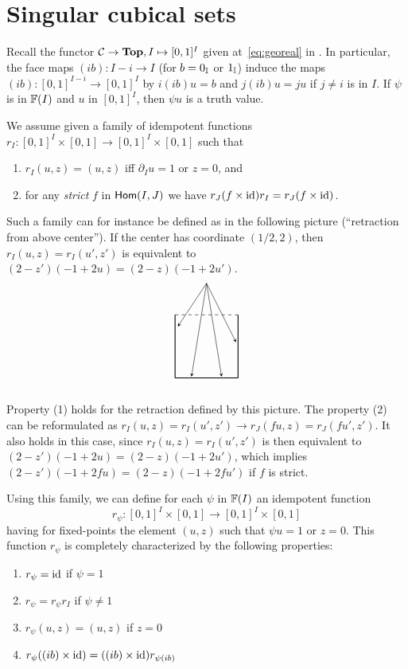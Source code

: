 \section{Singular cubical sets}\label{sec-singular}

Recall the functor $\mathcal{C} \to \mathbf{Top}, I \mapsto [0,1]^I$ given
at~\eqref{eq:georeal} in . In particular, the face
maps $(ib) \colon I-i \to I$ (for $b=0_{\mathbb{I}}$ or $1_{\mathbb{I}}$) induce the
maps $(ib)\colon [0,1]^{I-i} \to [0, 1]^{I}$ by $i(ib)u = b$ and
$j(ib)u = ju$ if $j\neq i$ is in $I$.  If $\psi$ is in $\mathbb{F}(I)$ and
$u$ in $[0,1]^I$, then $\psi u$ is a truth value.

We assume given a family of idempotent functions
$r_I:[0,1]^I\times [0,1]\rightarrow [0,1]^I\times [0,1]$ such that
\begin{enumerate}
\item $r_I(u,z) = (u,z)$ if{f} $\partial_I u = 1$ or $z = 0$, and
\item for any {\em strict} $f$ in ${\sf Hom}(I,J)$ we have
  $r_J(f\times\mathrm{id})r_I = r_J(f\times\mathrm{id})$.
\end{enumerate}

\medskip

Such a family can for instance be defined as in the following picture
(``retraction from above center''). If the center has coordinate
$(1/2,2)$, then $r_I(u,z) = r_I(u',z')$ is equivalent to $(2-z')
(-1+2u) = (2-z) (-1+2u')$.
$$
\begin{tikzpicture}[scale=2]
  \draw [thick,solid] (0,0) --
  node [near start,below=-1pt] (DL) {}
  node [near end,below=-1pt] (DR) {}
  (1,0);
  \draw [thick,solid] (0,0) --
  node [near end,](L) {} (0,1);
  \draw [thick,solid] (1,0) -- node (R) {} (1,1);
  \draw [dashed] (0,1) -- (1,1);
  \def\raypt{(0.5,1.5)}
  \draw[->,>=stealth]\raypt -- (DL);
  \draw[->,>=stealth]\raypt -- (DR);
  \draw[->,>=stealth]\raypt -- (L);
  \draw[->,>=stealth]\raypt -- (R);
\end{tikzpicture}
$$

Property (1) holds for the retraction defined by this picture.
The property (2) can be reformulated as $r_I(u,z) =
r_I(u',z')\rightarrow r_J(f u,z) = r_J(f u',z')$. It also holds
in this case,
since $r_I(u,z) = r_I(u',z')$ is then equivalent to $(2-z') (-1+2u) = (2-z) (-1+2u')$,
which implies $(2-z') (-1+2f u) = (2-z)(-1+2 f u')$ if $f$ is strict.


Using this family, we can define for each $\psi$ in $\mathbb{F}(I)$ an
idempotent function
\[
r_{\psi}:[0,1]^I\times [0,1]\rightarrow [0,1]^I\times [0,1]
\]
having for fixed-points the element $(u,z)$ such that $\psi u = 1$ or $z = 0$.
This function $r_{\psi}$ is completely characterized by the following properties:
\begin{enumerate}
\item $r_{\psi} = \mathrm{id}$ if $\psi = 1$
\item $r_{\psi} = r_{\psi}r_I$ if $\psi \neq 1$
\item $r_{\psi}(u,z) = (u,z)$ if $z = 0$
\item $r_{\psi}((ib)\times\mathrm{id}) = ((ib)\times\mathrm{id})r_{\psi(ib)}$
\end{enumerate}

